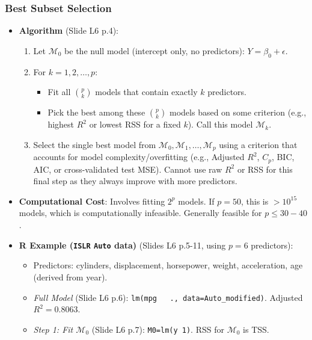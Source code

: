 \documentclass[12pt,a4paper]{article}
\newcommand{\Rpackage}[1]{\texttt{#1}} %
\newcommand{\Robject}[1]{\texttt{#1}} %
\newcommand{\Rcode}[1]{\texttt{#1}} %
\begin{document}
\begin{itemize}
\begin{itemize}
\begin{itemize}
    \subsubsection{Best Subset Selection }
        \begin{itemize}
            \item \textbf{Algorithm} (Slide L6 p.4):
                \begin{enumerate}
                    \item Let $\mathcal{M}_0$ be the null model (intercept only, no predictors): $Y = \beta_0 + \epsilon$.
                    \item For $k = 1, 2, \dots, p$:
                        \begin{itemize}
                            \item Fit all $\binom{p}{k}$ models that contain exactly $k$ predictors.
                            \item Pick the best among these $\binom{p}{k}$ models based on some criterion (e.g., highest $R^2$ or lowest RSS for a fixed $k$). Call this model $\mathcal{M}_k$.
                        \end{itemize}
                    \item Select the single best model from $\mathcal{M}_0, \mathcal{M}_1, \dots, \mathcal{M}_p$ using a criterion that accounts for model complexity/overfitting (e.g., Adjusted $R^2$, $C_p$, BIC, AIC, or cross-validated test MSE). Cannot use raw $R^2$ or RSS for this final step as they always improve with more predictors.
                \end{enumerate}
            \item \textbf{Computational Cost}: Involves fitting $2^p$ models. If $p=50$, this is $>10^{15}$ models, which is computationally infeasible. Generally feasible for $p \le 30-40$.
            \item \textbf{R Example (\Rpackage{ISLR} \Robject{Auto} data)} (Slides L6 p.5-11, using $p=6$ predictors):
                \begin{itemize}
                    \item Predictors: cylinders, displacement, horsepower, weight, acceleration, age (derived from year).
                    \item \textit{Full Model} (Slide L6 p.6): \Rcode{lm(mpg ~ ., data=Auto_modified)}. Adjusted $R^2 = 0.8063$.
                    \item \textit{Step 1: Fit $\mathcal{M}_0$} (Slide L6 p.7): \Rcode{M0=lm(y~1)}. RSS for $\mathcal{M}_0$ is TSS.

\end{itemize}
\end{itemize}
\end{itemize}
\end{itemize}
\end{itemize}
\end{document}
